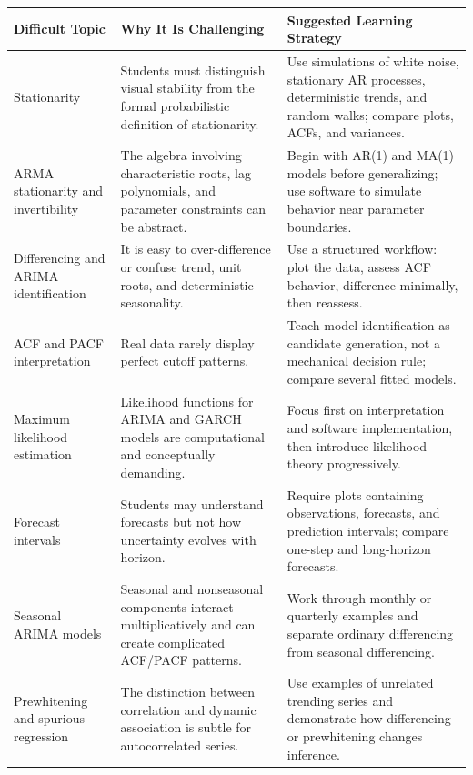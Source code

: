 \documentclass[11pt]{article}
\begin{document}
\begin{longtable}{p{} p{} p{}}
\toprule
\textbf{Difficult Topic} & \textbf{Why It Is Challenging} & \textbf{Suggested Learning Strategy} \\
\midrule
\endhead

Stationarity & Students must distinguish visual stability from the formal probabilistic definition of stationarity. & Use simulations of white noise, stationary AR processes, deterministic trends, and random walks; compare plots, ACFs, and variances. \\

ARMA stationarity and invertibility & The algebra involving characteristic roots, lag polynomials, and parameter constraints can be abstract. & Begin with AR(1) and MA(1) models before generalizing; use software to simulate behavior near parameter boundaries. \\

Differencing and ARIMA identification & It is easy to over-difference or confuse trend, unit roots, and deterministic seasonality. & Use a structured workflow: plot the data, assess ACF behavior, difference minimally, then reassess. \\

ACF and PACF interpretation & Real data rarely display perfect cutoff patterns. & Teach model identification as candidate generation, not a mechanical decision rule; compare several fitted models. \\

Maximum likelihood estimation & Likelihood functions for ARIMA and GARCH models are computational and conceptually demanding. & Focus first on interpretation and software implementation, then introduce likelihood theory progressively. \\

Forecast intervals & Students may understand forecasts but not how uncertainty evolves with horizon. & Require plots containing observations, forecasts, and prediction intervals; compare one-step and long-horizon forecasts. \\

Seasonal ARIMA models & Seasonal and nonseasonal components interact multiplicatively and can create complicated ACF/PACF patterns. & Work through monthly or quarterly examples and separate ordinary differencing from seasonal differencing. \\

Prewhitening and spurious regression & The distinction between correlation and dynamic association is subtle for autocorrelated series. & Use examples of unrelated trending series and demonstrate how differencing or prewhitening changes inference. \\


\end{longtable}
\end{document}
